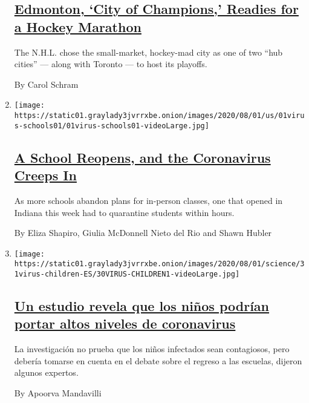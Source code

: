 \begin{enumerate}
{  \subsection{\texorpdfstring{\href{/2020/08/01/sports/hockey/edmonton-nhl-playoffs.html}{Edmonton,
  `City of Champions,' Readies for a Hockey
  Marathon}}{Edmonton, `City of Champions,' Readies for a Hockey Marathon}}\label{edmonton-city-of-champions-readies-for-a-hockey-marathon}}

  The N.H.L. chose the small-market, hockey-mad city as one of two ``hub
  cities'' --- along with Toronto --- to host its playoffs.

  By Carol Schram
\item
  \texttt{[image: https://static01.graylady3jvrrxbe.onion/images/2020/08/01/us/01virus-schools01/01virus-schools01-videoLarge.jpg]}

  \hypertarget{a-school-reopens-and-the-coronavirus-creeps-in}{%
  \subsection{\texorpdfstring{\href{/2020/08/01/us/schools-reopening-indiana-coronavirus.html}{A
  School Reopens, and the Coronavirus Creeps
  In}}{A School Reopens, and the Coronavirus Creeps In}}\label{a-school-reopens-and-the-coronavirus-creeps-in}}

  As more schools abandon plans for in-person classes, one that opened
  in Indiana this week had to quarantine students within hours.

  By Eliza Shapiro, Giulia McDonnell Nieto del Rio and Shawn Hubler
\item
  \texttt{[image: https://static01.graylady3jvrrxbe.onion/images/2020/08/01/science/31virus-children-ES/30VIRUS-CHILDREN1-videoLarge.jpg]}

  \hypertarget{un-estudio-revela-que-los-niuxf1os-podruxedan-portar-altos-niveles-de-coronavirus}{%
  \subsection{\texorpdfstring{\href{/es/2020/07/31/espanol/ciencia-y-tecnologia/ninos-contagio-coronavirus.html}{Un
  estudio revela que los niños podrían portar altos niveles de
  coronavirus}}{Un estudio revela que los niños podrían portar altos niveles de coronavirus}}\label{un-estudio-revela-que-los-niuxf1os-podruxedan-portar-altos-niveles-de-coronavirus}}

  La investigación no prueba que los niños infectados sean contagiosos,
  pero debería tomarse en cuenta en el debate sobre el regreso a las
  escuelas, dijeron algunos expertos.

  By Apoorva Mandavilli
\end{enumerate}

